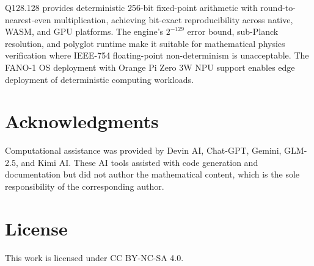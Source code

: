 \documentclass[11pt]{article}
\begin{document}
Q128.128 provides deterministic 256-bit fixed-point arithmetic with round-to-nearest-even multiplication, achieving bit-exact reproducibility across native, WASM, and GPU platforms. The engine's $2^{-129}$ error bound, sub-Planck resolution, and polyglot runtime make it suitable for mathematical physics verification where IEEE-754 floating-point non-determinism is unacceptable. The FANO-1 OS deployment with Orange Pi Zero 3W NPU support enables edge deployment of deterministic computing workloads.

\section*{Acknowledgments}

Computational assistance was provided by Devin AI, Chat-GPT, Gemini, GLM-2.5, and Kimi AI. These AI tools assisted with code generation and documentation but did not author the mathematical content, which is the sole responsibility of the corresponding author.

\section*{License}

This work is licensed under CC BY-NC-SA 4.0.



\end{document}
